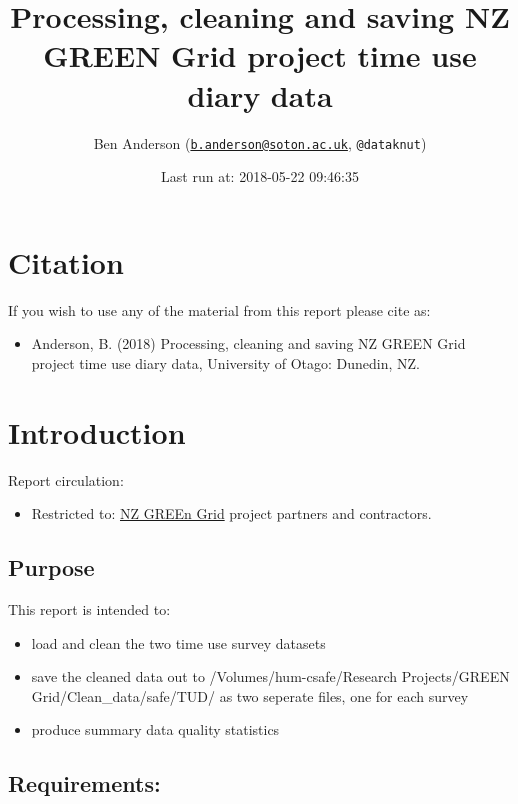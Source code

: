 \documentclass[]{article}
\title{Processing, cleaning and saving NZ GREEN Grid project time use diary
data}
\author{Ben Anderson
(\href{mailto:b.anderson@soton.ac.uk}{\nolinkurl{b.anderson@soton.ac.uk}},
\texttt{@dataknut})}
\date{Last run at: 2018-05-22 09:46:35}
\providecommand{\tightlist}{%
  \setlength{\itemsep}{0pt}\setlength{\parskip}{0pt}}
\begin{document}
\maketitle

{
\setcounter{tocdepth}{2}
\tableofcontents
}
\newpage

\section{Citation}\label{citation}

If you wish to use any of the material from this report please cite as:

\begin{itemize}
\tightlist
\item
  Anderson, B. (2018) Processing, cleaning and saving NZ GREEN Grid
  project time use diary data, University of Otago: Dunedin, NZ.
\end{itemize}

\newpage

\section{Introduction}\label{introduction}

Report circulation:

\begin{itemize}
\tightlist
\item
  Restricted to:
  \href{https://www.otago.ac.nz/centre-sustainability/research/energy/otago050285.html}{NZ
  GREEn Grid} project partners and contractors.
\end{itemize}

\subsection{Purpose}\label{purpose}

This report is intended to:

\begin{itemize}
\tightlist
\item
  load and clean the two time use survey datasets
\item
  save the cleaned data out to /Volumes/hum-csafe/Research
  Projects/GREEN Grid/Clean\_data/safe/TUD/ as two seperate files, one
  for each survey
\item
  produce summary data quality statistics
\end{itemize}

\subsection{Requirements:}\label{requirements}
\end{document}
